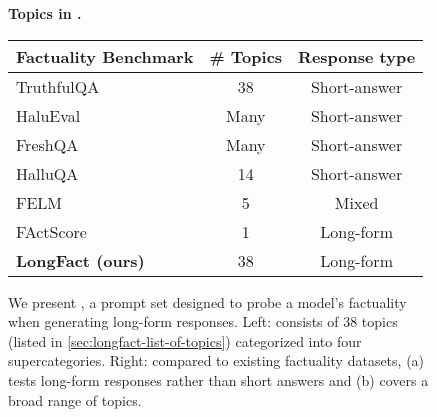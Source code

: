 \begin{figure}[t]
    \centering
    \begin{minipage}{1.0\linewidth}
    \small
    \textbf{\hspace{14mm} Topics in \longfact{}.} \\[1ex]
    \begin{adjustbox}{valign=c}
    \end{adjustbox}
    \small
    \begin{adjustbox}{valign=c}
    \vspace{-50mm}
    \begin{tabular}{l | cc}
        \toprule
        Factuality Benchmark & \# Topics & Response type \\
        \midrule
        TruthfulQA \citep{lin2022truthfulqa}        & 38        &   Short-answer \\
        HaluEval \citep{li2023halueval}             & Many      &   Short-answer \\
        FreshQA \citep{vu2023freshllms}             & Many      &   Short-answer \\
        HalluQA \citep{cheng2023evaluating}         & 14        &   Short-answer \\
        FELM \citep{chen2023felm}                   & 5         &   Mixed \\
        FActScore \citep{min2023factscore}          & 1         &   Long-form \\
        \textbf{LongFact (ours)}                    & 38        &   Long-form \\
        \bottomrule
    \end{tabular}
    \end{adjustbox}
    \end{minipage}
    \caption{
        We present \longfact{}, a prompt set designed to probe a model's factuality when generating long-form responses.
        Left: \longfact{} consists of 38 topics (listed in \cref{sec:longfact-list-of-topics}) categorized into four supercategories.
        Right: compared to existing factuality datasets, \longfact{} (a) tests long-form responses rather than short answers and (b) covers a broad range of topics.
    }
    \label{fig:longfact-main-figure}
    \vspace{-2mm}
\end{figure}